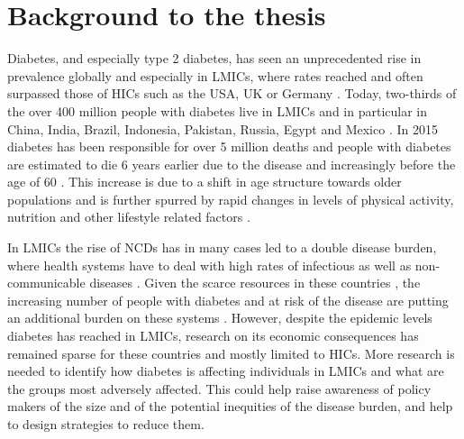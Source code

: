 
\section{Background to the thesis}

Diabetes, and especially type 2 diabetes, has seen an unprecedented rise in prevalence globally and especially in \acp{LMIC}, where rates reached and often surpassed those of \acp{HIC} such as the USA, UK or Germany \parencite{Risk2016,Hu2011}. Today, two-thirds of the over 400 million people with diabetes live in \acp{LMIC} \parencite{InternationalDiabetesFederation2013} and in particular in China, India, Brazil, Indonesia, Pakistan, Russia, Egypt and Mexico \parencite{Risk2016}. In 2015 diabetes has been responsible for over 5 million deaths and people with diabetes are estimated to die 6 years earlier due to the disease and increasingly before the age of 60 \parencite{InternationalDiabetesFederation2015,Seshasai2011}. This increase is due to a shift in age structure towards older populations and is further spurred by rapid changes in levels of physical activity, nutrition and other lifestyle related factors \parencite{Risk2016,Hu2011}.

In \acp{LMIC} the rise of \acp{NCD} has in many cases led to a double disease burden, where health systems have to deal with high rates of infectious as well as non-communicable diseases \parencite{Jamison2013}. Given the scarce resources in these countries \parencite{Mills2014}, the increasing number of people with diabetes and at risk of the disease are putting an additional burden on these systems \parencite{Wareham2016,Chan2016}. However, despite the epidemic levels diabetes has reached in \acp{LMIC}, research on its economic consequences has remained sparse for these countries and mostly limited to \acp{HIC}. More research is needed to identify how diabetes is affecting individuals in \acp{LMIC} and what are the groups most adversely affected. This could help raise awareness of policy makers of the size and of the potential inequities of the disease burden, and help to design strategies to reduce them.

